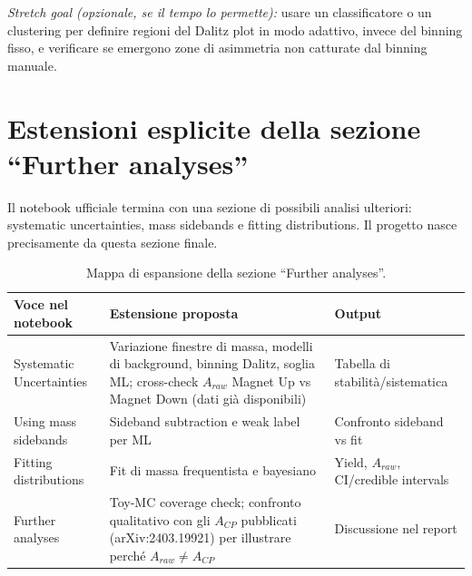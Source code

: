 \documentclass[11pt,a4paper]{article}
\begin{document}
\noindent\emph{Stretch goal (opzionale, se il tempo lo permette):} usare un classificatore o un clustering per definire regioni del Dalitz plot in modo adattivo, invece del binning fisso, e verificare se emergono zone di asimmetria non catturate dal binning manuale.

\section{Estensioni esplicite della sezione ``Further analyses''}

Il notebook ufficiale termina con una sezione di possibili analisi ulteriori: systematic uncertainties, mass sidebands e fitting distributions. Il progetto nasce precisamente da questa sezione finale.

\begin{table}[h!]
\centering
\begin{tabular}{L{3.2cm} L{5.6cm} L{4.3cm}}
\toprule
\textbf{Voce nel notebook} & \textbf{Estensione proposta} & \textbf{Output} \\
\midrule
Systematic Uncertainties & Variazione finestre di massa, modelli di background, binning Dalitz, soglia ML; cross-check $A_{raw}$ Magnet Up vs Magnet Down (dati già disponibili) & Tabella di stabilità/sistematica \\
Using mass sidebands & Sideband subtraction e weak label per ML & Confronto sideband vs fit \\
Fitting distributions & Fit di massa frequentista e bayesiano & Yield, $A_{raw}$, CI/credible intervals \\
Further analyses & Toy-MC coverage check; confronto qualitativo con gli $A_{CP}$ pubblicati (arXiv:2403.19921) per illustrare perché $A_{raw} \neq A_{CP}$ & Discussione nel report \\
\bottomrule
\end{tabular}
\caption{Mappa di espansione della sezione ``Further analyses''.}
\end{table}
\end{document}
